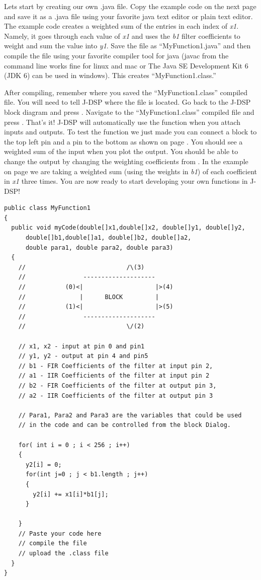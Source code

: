 Lets start by creating our own .java file. Copy the example code on
the next page and save it as a .java file using your favorite java
text editor or plain text editor. The example code creates a weighted
sum of the entries in each index of {\it x1}. Namely, it goes through
each value of {\it x1} and uses the {\it b1} filter coefficients to
weight and sum the value into {\it y1}. Save the file as
``MyFunction1.java'' and then compile the file using your favorite
compiler tool for java (javac from the command line works fine for
linux and mac or The Java SE Development Kit 6 (JDK 6) can be used in
windows). This creates ``MyFunction1.class.''

After compiling, remember where you saved the ``MyFunction1.class''
compiled file. You will need to tell J-DSP where the file is
located. Go back to the J-DSP block diagram and press
. Navigate to the ``MyFunction1.class'' compiled file and
press . That's it! J-DSP will automatically use the
function when you attach inputs and outputs. To test the function we
just made you can connect a  block to the top left pin
and a  pin to the bottom as shown on page
\pageref{fg:userdefexample}. You should see a weighted sum of the
input when you plot the output. You should be able to change the
output by changing the weighting coefficients from . In
the example on page \pageref{fg:userdefexample} we are taking a
weighted sum (using the weights in {\it b1}) of each coefficient in
{\it x1} three times.  You are now ready to start developing your own
functions in J-DSP!

\begin{lstlisting} 
public class MyFunction1
{
  public void myCode(double[]x1,double[]x2, double[]y1, double[]y2,
      double[]b1,double[]a1, double[]b2, double[]a2, 
      double para1, double para2, double para3)
  {
    //                            /\(3)
    //                --------------------           
    //           (0)<|                    |>(4)
    //               |      BLOCK         |    
    //           (1)<|                    |>(5)
    //                --------------------           
    //                            \/(2)
		
    // x1, x2 - input at pin 0 and pin1
    // y1, y2 - output at pin 4 and pin5
    // b1 - FIR Coefficients of the filter at input pin 2, 
    // a1 - IIR Coefficients of the filter at input pin 2
    // b2 - FIR Coefficients of the filter at output pin 3, 
    // a2 - IIR Coefficients of the filter at output pin 3
		
    // Para1, Para2 and Para3 are the variables that could be used 
    // in the code and can be controlled from the block Dialog.
		
    for( int i = 0 ; i < 256 ; i++)
    {
      y2[i] = 0;
      for(int j=0 ; j < b1.length ; j++)
      {
        y2[i] += x1[i]*b1[j];
      }
			
    }
    // Paste your code here
    // compile the file
    // upload the .class file
  }
}
\end{lstlisting}

